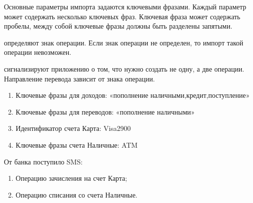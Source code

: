 \documentclass[a4paper,10pt,russian]{sphinxmanual}
\begin{document}
\sphinxAtStartPar
Основные параметры импорта задаются ключевыми фразами. Каждый параметр может содержать несколько ключевых фраз.
Ключевая фраза может содержать пробелы, между собой ключевые фразы должны быть разделены запятыми.

\sphinxAtStartPar
{} определяют знак операции. Если знак операции не определен, то импорт такой операции невозможен.

\sphinxAtStartPar
{} сигнализируют приложению о том, что нужно создать не одну, а две операции. Направление
перевода зависит от знака операции.
\begin{description}
\begin{enumerate}
%
\item {} 
\sphinxAtStartPar
Ключевые фразы для доходов: «пополнение наличными,кредит,поступление»

\item {} 
\sphinxAtStartPar
Ключевые фразы для переводов: «пополнение наличными»

\item {} 
\sphinxAtStartPar
Идентификатор счета Карта: Visa2900

\item {} 
\sphinxAtStartPar
Ключевые фразы счета Наличные: ATM

\end{enumerate}

\end{description}

\sphinxAtStartPar
От банка поступило SMS:

\begin{sphinxVerbatim}[commandchars=\\\{\}]
         
\end{sphinxVerbatim}
\begin{description}
\begin{enumerate}
%
\item {} 
\sphinxAtStartPar
Операцию зачисления на счет Карта;

\item {} 
\sphinxAtStartPar
Операцию списания со счета Наличные.

\end{enumerate}

\end{description}
\end{document}
